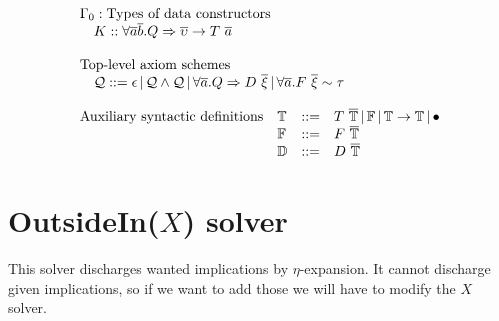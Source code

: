 \documentclass{article}
\newcommand{\hasgrammar}{::=}
\newcommand{\orprod}{\, | \,}
\newcommand{\multi}[1]{{\overline{#1}}}
\newcommand{\bvar}[2]{#1 :: #2}
\newcommand{\Q}{\mathcal{Q}}
\newcommand{\To}{\Rightarrow}
\newcommand{\D}{\mathbb{D}} %
\newcommand{\T}{\mathbb{T}} %
\newcommand{\F}{\mathbb{F}} %
\begin{document}
\[\begin{array}{llcl}
\\
\multicolumn{4}{l}{\Gamma_0 : \text{Types of data constructors}} \\
\multicolumn{4}{l}{\quad \bvar{K}{\forall \multi{a} \multi{b}. Q \To \multi{\upsilon} \to T ~ \multi{a}}} \\

\\
\multicolumn{4}{l}{\text{Top-level axiom schemes}} \\
\multicolumn{4}{l}{\quad \Q \hasgrammar \epsilon \orprod \Q \land \Q \orprod \forall \multi{a}. Q \To D ~ \multi{\xi} \orprod \forall \multi{a}. F ~ \multi{\xi} \sim \tau} \\

\\
\text{Auxiliary syntactic definitions} & \T & \hasgrammar & T ~ \multi{\T} \orprod \F \orprod \T \to \T \orprod \bullet \\
                                       & \F & \hasgrammar & F ~ \multi{\T} \\
                                       & \D & \hasgrammar & D ~ \multi{\T} \\

\end{array}
\]


\section{OutsideIn($X$) solver}

This solver discharges wanted implications by $\eta$-expansion. It cannot discharge given implications, so if we want
to add those we will have to modify the $X$ solver.

\newcommand{\simple}[1]{\textbf{simple}[#1]}
\newcommand{\implic}[1]{\textbf{implic}[#1]}
\end{document}
